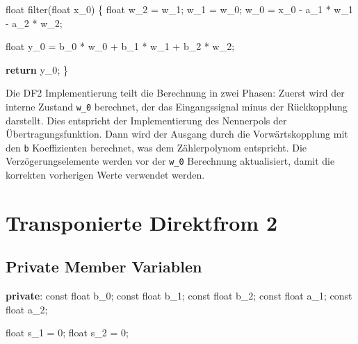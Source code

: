 \documentclass[
  ngerman,
  letterpaper,
  DIV=11]{scrreprt}
\newenvironment{Shaded}{\begin{snugshade}}{\end{snugshade}}
\newcommand{\AttributeTok}[1]{\textcolor[rgb]{0.40,0.45,0.13}{#1}}
\newcommand{\ControlFlowTok}[1]{\textcolor[rgb]{0.00,0.23,0.31}{\textbf{#1}}}
\newcommand{\DataTypeTok}[1]{\textcolor[rgb]{0.68,0.00,0.00}{#1}}
\newcommand{\DecValTok}[1]{\textcolor[rgb]{0.68,0.00,0.00}{#1}}
\newcommand{\KeywordTok}[1]{\textcolor[rgb]{0.00,0.23,0.31}{\textbf{#1}}}
\newcommand{\NormalTok}[1]{\textcolor[rgb]{0.00,0.23,0.31}{#1}}
\newcommand{\OperatorTok}[1]{\textcolor[rgb]{0.37,0.37,0.37}{#1}}
\newcommand{\VariableTok}[1]{\textcolor[rgb]{0.07,0.07,0.07}{#1}}
\begin{document}
\begin{Shaded}
\begin{Highlighting}[]
\DataTypeTok{float}\NormalTok{ filter}\OperatorTok{(}\DataTypeTok{float}\NormalTok{ x\_0}\OperatorTok{)}
\OperatorTok{\{}
  \DataTypeTok{float}\NormalTok{ w\_2 }\OperatorTok{=}\NormalTok{ w\_1}\OperatorTok{;}
\NormalTok{  w\_1 }\OperatorTok{=}\NormalTok{ w\_0}\OperatorTok{;}
\NormalTok{  w\_0 }\OperatorTok{=}\NormalTok{ x\_0 }\OperatorTok{{-}}\NormalTok{ a\_1 }\OperatorTok{*}\NormalTok{ w\_1 }\OperatorTok{{-}}\NormalTok{ a\_2 }\OperatorTok{*}\NormalTok{ w\_2}\OperatorTok{;}

  \DataTypeTok{float}\NormalTok{ y\_0 }\OperatorTok{=}\NormalTok{ b\_0 }\OperatorTok{*}\NormalTok{ w\_0 }\OperatorTok{+}\NormalTok{ b\_1 }\OperatorTok{*}\NormalTok{ w\_1 }\OperatorTok{+}\NormalTok{ b\_2 }\OperatorTok{*}\NormalTok{ w\_2}\OperatorTok{;}

  \ControlFlowTok{return}\NormalTok{ y\_0}\OperatorTok{;}
\OperatorTok{\}}  
\end{Highlighting}
\end{Shaded}

Die DF2 Implementierung teilt die Berechnung in zwei Phasen: Zuerst wird
der interne Zustand \texttt{w\_0} berechnet, der das Eingangssignal
minus der Rückkopplung darstellt. Dies entspricht der Implementierung
des Nennerpols der Übertragungsfunktion. Dann wird der Ausgang durch die
Vorwärtskopplung mit den \texttt{b} Koeffizienten berechnet, was dem
Zählerpolynom entspricht. Die Verzögerungselemente werden vor der
\texttt{w\_0} Berechnung aktualisiert, damit die korrekten vorherigen
Werte verwendet werden.

\section{Transponierte Direktfrom 2}\label{transponierte-direktfrom-2}

\subsection{Private Member Variablen}\label{private-member-variablen-2}

\begin{Shaded}
\begin{Highlighting}[]
\KeywordTok{private}\OperatorTok{:}
  \AttributeTok{const} \DataTypeTok{float}\NormalTok{ b\_0}\OperatorTok{;} 
  \AttributeTok{const} \DataTypeTok{float}\NormalTok{ b\_1}\OperatorTok{;}
  \AttributeTok{const} \DataTypeTok{float}\NormalTok{ b\_2}\OperatorTok{;}
  \AttributeTok{const} \DataTypeTok{float}\NormalTok{ a\_1}\OperatorTok{;}
  \AttributeTok{const} \DataTypeTok{float}\NormalTok{ a\_2}\OperatorTok{;}

  \DataTypeTok{float} \VariableTok{s\_1} \OperatorTok{=} \DecValTok{0}\OperatorTok{;}
  \DataTypeTok{float} \VariableTok{s\_2} \OperatorTok{=} \DecValTok{0}\OperatorTok{;}
\end{Highlighting}
\end{Shaded}
\end{document}
